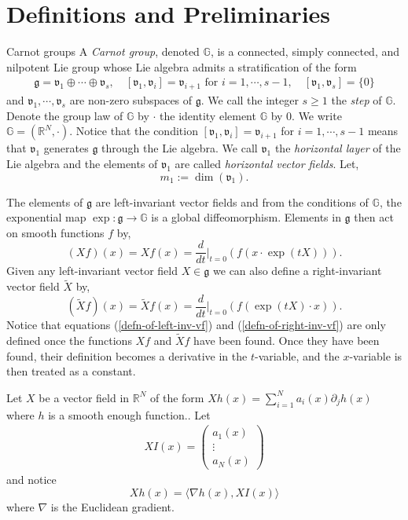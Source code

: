 \documentclass[12pt,a4paper,reqno]{amsart}
\newcommand{\wt}{\widetilde}
\newcommand{\g}{\mathfrak{g}}
\newcommand{\vf}{\mathfrak{v}}
\newcommand{\R}{\mathbb{R}}
\newcommand{\G}{\mathbb{G}}
\numberwithin{equation}{section}
\theoremstyle{definition}
\begin{document}
\section{Definitions and Preliminaries}\label{section-2}
\begin{subsection}{Carnot groups}
A \textit{Carnot group}, denoted $\G$, is a connected, simply connected, and nilpotent Lie group whose Lie algebra admits a stratification of the form \begin{align*}
    \g = \vf_1 \oplus \cdots \oplus \vf_s, \quad [\vf_1, \vf_i] = \vf_{i+1} \text{ for }i = 1, \cdots, s-1, \quad [\vf_1, \vf_s]= \{0\}
\end{align*}
and $\vf_1, \cdots, \vf_s$ are non-zero subspaces of $\g$. We call the integer $s \geq 1$ the \textit{step} of $\G$. Denote the group law of $\G$ by $\cdot$ the identity element $\G$ by $0$. We write $\G = (\R^N, \cdot)$. Notice that the condition $[\vf_1, \vf_i] = \vf_{i+1}$ for $i = 1, \cdots, s-1$ means that $\vf_1$ generates $\g$ through the Lie algebra. We call $\vf_1$ the \textit{horizontal layer} of the Lie algebra and the elements of $\vf_1$ are called \textit{horizontal vector fields}. Let,\begin{equation}\label{dim-of-first-layer}
m_1 := \dim(\vf_1).
\end{equation} 

The elements of $\g$ are left-invariant vector fields and from the conditions of $\G$, the exponential map $\exp : \g \rightarrow \G$ is a global diffeomorphism. Elements in $\g$ then act on smooth functions $f$ by, 
\begin{equation}\label{defn-of-left-inv-vf}
(X f)(x) = Xf(x) = \frac{d}{dt}\bigg|_{t=0} \left( f(x\cdot \exp(tX) ) \right).  
\end{equation} 
Given any left-invariant vector field $X \in \g$ we can also define a right-invariant vector field $\wt{X}$ by, 
\begin{equation}\label{defn-of-right-inv-vf}
(\wt{X}f)(x) = \wt{X}f(x) = \frac{d}{dt}\bigg|_{t=0} \left( f(\exp(tX)\cdot x) \right).
\end{equation}
Notice that equations (\ref{defn-of-left-inv-vf}) and (\ref{defn-of-right-inv-vf}) are only defined once the functions $Xf$ and $\wt{X}f$ have been found. Once they have been found, their definition becomes a derivative in the $t$-variable, and the $x$-variable is then treated as a constant.

Let $X$ be a vector field in $\R^N$ of the form $X h(x)= \sum_{i=1}^N a_i(x)\partial_j h(x)$ where $h$ is a smooth enough function.. Let \begin{align*}
    XI(x) = \begin{pmatrix}
        a_1(x) \\ \vdots \\ a_N(x)
    \end{pmatrix}
\end{align*}
and notice \begin{equation}\label{XI-notation}
    Xh(x) = \langle \nabla h(x), XI(x)\rangle
\end{equation} where $\nabla$ is the Euclidean gradient.


\end{subsection}
\end{document}
